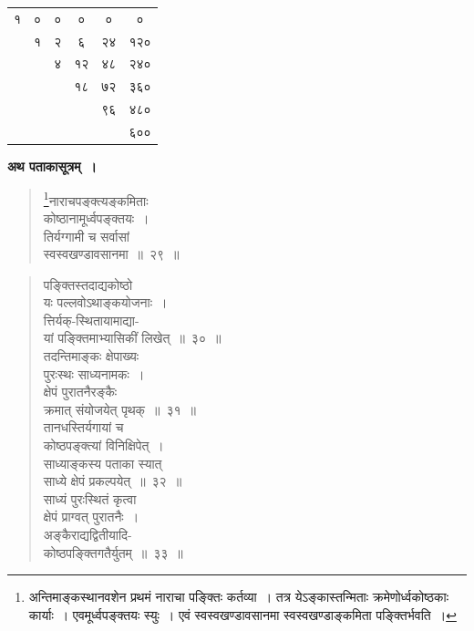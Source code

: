 \documentclass[11pt, openany]{book}
\begin{document}
\begin{table}[h]

\hspace{20mm} \begin{tabular}{|c|c|c|c|c|c|}
		\hline
		{\hbox{१}} & {\hbox{०}} & {\hbox{०}} & {\hbox{०}} & {\hbox{०}} & {\hbox{०}}\\
		\cline{1-6}
		\multicolumn{1}{c|}{} 	&	{\hbox{१}} & {\hbox{२}} & {\hbox{६}} & {\hbox{२४}} &  {\hbox{१२०}}\\
		\cline{2-6}
		\multicolumn{1}{c}{} 	&	\multicolumn{1}{c|}{} &    {\hbox{४}} & {\hbox{१२}} & {\hbox{४८}} &  {\hbox{२४०}}\\
		\cline{3-6}
		\multicolumn{1}{c}{} 	&	\multicolumn{1}{c}{} &    \multicolumn{1}{c|}{} & {\hbox{१८}} & {\hbox{७२}} &  {\hbox{३६०}}\\
		\cline{4-6}
		\multicolumn{1}{c}{} 	&	\multicolumn{1}{c}{} &    \multicolumn{1}{c}{} & 	\multicolumn{1}{c|}{} & {\hbox{९६}} &  {\hbox{४८०}}\\
		\cline{5-6}
		\multicolumn{1}{c}{} 	&	\multicolumn{1}{c}{} &    \multicolumn{1}{c}{} & 	\multicolumn{1}{c}{} & \multicolumn{1}{c|}{} &  {\hbox{६००}}\\
		\cline{6-6}
	\end{tabular}
\end{table}
\vspace{4mm}

\textbf{अथ पताकासूत्रम्~।}

\begin{quote}
\renewcommand{\thefootnote}{१}\footnote{अन्तिमाङ्कस्थानवशेन प्रथमं नाराचा पङ्क्तिः कर्तव्या~। तत्र येऽङ्कास्तन्मिताः क्रमेणोर्ध्वकोष्ठकाः कार्याः~। एवमूर्ध्वपङ्क्तयः स्युः~। एवं स्वस्वखण्डावसानमा स्वस्वखण्डाङ्कमिता पङ्क्तिर्भवति~।}{\gk नाराचपङ्क्त्यङ्कमिताः\\
कोष्ठानामूर्ध्वपङ्क्तयः~।\\
तिर्यग्गामी च सर्वासां\\
स्वस्वखण्डावसानमा~॥~२९~॥}	
\end{quote}

\newpage

\begin{quote}
{\gk पङ्क्तिस्तदाद्यकोष्ठो\\
यः पल्लवोऽथाङ्कयोजनाः~।\\
त्तिर्यक्-स्थितायामाद्या-\\
यां पङ्क्तिमाभ्यासिकीं लिखेत्~॥~३०~॥\\
तदन्तिमाङ्कः क्षेपाख्यः\\
पुरःस्थः साध्यनामकः~।\\
क्षेपं पुरातनैरङ्कैः\\
क्रमात् संयोजयेत् पृथक्~॥~३१~॥\\
तानधस्तिर्यगायां च\\
कोष्ठपङ्क्त्यां विनिक्षिपेत्~।\\
साध्याङ्कस्य पताका स्यात्\\
साध्ये क्षेपं प्रकल्पयेत्~॥~३२~॥\\
साध्यं पुरःस्थितं कृत्वा\\
क्षेपं प्राग्वत् पुरातनैः~।\\
अङ्कैराद्यद्वितीयादि-\\
कोष्ठपङ्क्तिगतैर्युतम्~॥~३३~॥}
\end{quote}
\end{document}
